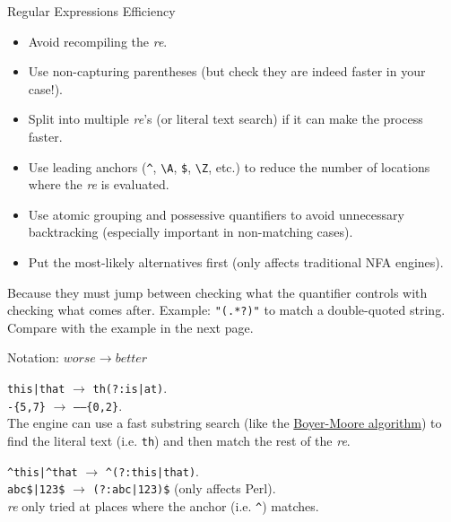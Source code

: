 \documentclass[11pt, a4paper, landscape]{scrartcl}
\newcommand{\regex}[1]{\texttt{#1}}
\newcommand{\cregex}[1]{\colorbox{gray!30}{\regex{#1}}}
\newcommand{\bs}{\textbackslash}
\newcommand{\re}{\textit{re}}
\begin{document}
\begin{cheatsheet}{Regular Expressions Efficiency}

\begin{col1}

\begin{itemize}
	\item Avoid recompiling the \re.
	\item Use non-capturing parentheses (but check they are indeed faster in
		your case!).
	\item Split into multiple \re's (or literal text search) if
		it can make the process faster.
	\item Use leading anchors (\cregex{\^{}}, \cregex{\bs{}A}, \cregex{\$},
		\cregex{\bs{}Z}, etc.) to reduce the number of locations where the
		\re{} is evaluated.
	\item Use atomic grouping and possessive quantifiers to avoid unnecessary
		backtracking (especially important in non-matching cases).
	\item Put the most-likely alternatives first (only affects traditional NFA
		engines).
\end{itemize}


Because they must jump between checking what the quantifier controls with
checking what comes after. Example: \cregex{"(.*?)"} to match a double-quoted
string. Compare with the example in the next page.

\end{col1}

\begin{col2}

Notation: $worse\to better$


\cregex{this|that} $\to$ \cregex{th(?:is|at)}.\\
\cregex{-\{5,7\}} $\to$ \cregex{------\{0,2\}}.\\
The engine can use a fast substring search (like the
\href{https://en.wikipedia.org/wiki/Boyer–Moore_string_search_algorithm}{Boyer-Moore algorithm}) to
find the literal text (i.e. \cregex{th}) and then match the rest of the \re.


\cregex{\^{}this|\^{}that} $\to$ \cregex{\^{}(?:this|that)}.\\
\cregex{abc\$|123\$} $\to$ \cregex{(?:abc|123)\$} (only affects Perl).\\
\re{} only tried at places where the anchor (i.e. \cregex{\^{}}) matches.


\end{col2}
\end{cheatsheet}
\end{document}
